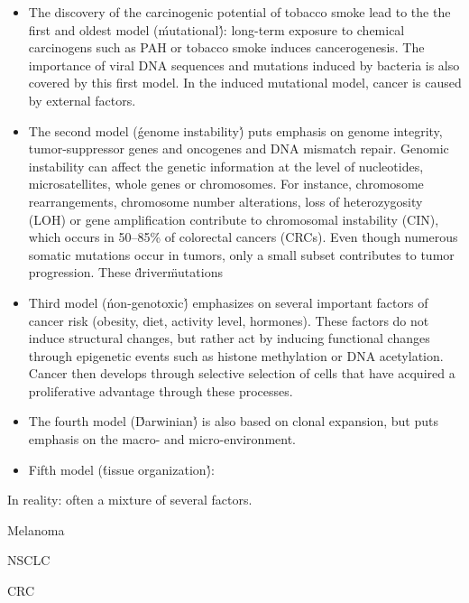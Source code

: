     \begin{itemize}
      \item The discovery of the carcinogenic potential of tobacco smoke lead to
        the the first and oldest model (\'mutational\'): long-term exposure to chemical
        carcinogens such as PAH or tobacco smoke induces cancerogenesis. The
        importance of viral DNA sequences and mutations induced by bacteria is also
        covered by this first model. In the induced mutational model, cancer is
        caused by external factors.

      \item The second model (\'genome instability\') puts emphasis on genome
        integrity, tumor-suppressor genes and oncogenes and DNA mismatch repair.
        Genomic instability can affect the genetic information at the level of
        nucleotides, microsatellites, whole genes or chromosomes. For instance,
        chromosome rearrangements, chromosome number alterations, loss of
        heterozygosity (LOH) or gene amplification contribute to chromosomal
        instability (CIN), which occurs in 50--85\% of colorectal cancers (CRCs).
        Even though numerous somatic mutations occur in tumors, only a small subset
        contributes to tumor progression. These \"driver\" mutations

      \item Third model (\'non-genotoxic\') emphasizes on several important factors
        of cancer risk (obesity, diet, activity level, hormones). These factors do
        not induce structural changes, but rather act by inducing functional
        changes through epigenetic events such as histone methylation or DNA
        acetylation. Cancer then develops through selective selection of cells
        that have acquired a proliferative advantage through these processes.

      \item The fourth model (\'Darwinian\') is also based on clonal expansion, but
        puts emphasis on the macro- and micro-environment.

      \item Fifth model (\'tissue organization\'):

    \end{itemize}

    In reality: often a mixture of several factors.

    Melanoma

    NSCLC

    CRC



